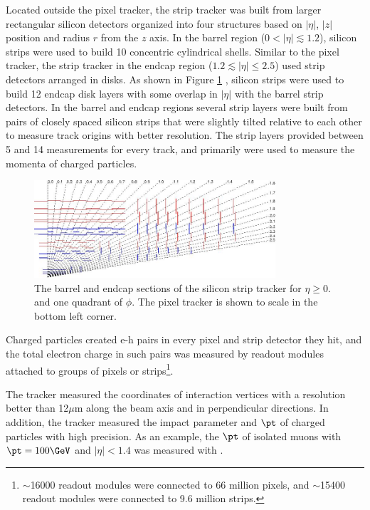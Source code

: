 Located outside the pixel tracker, the strip tracker was built from larger rectangular silicon detectors 
organized into four structures based on $|\eta|$, $|z|$ position and radius $r$ from the $z$ axis.  In the barrel region 
($0 < |\eta| \lesssim 1.2$), silicon strips were used to build 10 concentric cylindrical shells.  Similar to the pixel tracker, the strip tracker in 
the endcap region ($1.2 \lesssim |\eta| \leq 2.5$) used strip detectors arranged in disks.  As shown in Figure \ref{fig:stripTracker} 
\cite{cmsTDR}, silicon strips were used to build 12 endcap disk layers with some overlap in $|\eta|$ with the 
barrel strip detectors.  In the barrel and endcap regions several strip layers were built from pairs of closely spaced 
silicon strips that were slightly tilted relative to each other to measure track origins with better resolution.  The 
strip layers provided between 5 and 14 measurements for every track, and primarily were used to measure the momenta 
of charged particles.

\begin{figure}[ht]
	\centering
	\includegraphics[width=0.8\textwidth]{figures/siliconStripAndPixelDetectorTwoDimView.png}
	\caption{The barrel and endcap sections of the silicon strip tracker for $\eta \geq 0.$ and one quadrant of $\phi$.  
	The pixel tracker is shown to scale in the bottom left corner.}
	\label{fig:stripTracker}
\end{figure}

Charged particles created e-h pairs in every pixel and strip detector they hit, and the total electron charge in such pairs was measured by readout 
modules attached to groups of pixels or strips\footnote{$\sim$16000 readout modules were connected to 66 million pixels, 
and $\sim$15400 readout modules were connected to 9.6 million strips.}.  


The tracker measured the coordinates of interaction vertices with a resolution better than 12$\mu$m along the beam axis 
and in perpendicular directions.  In addition, the tracker measured the impact parameter and $\pt$ of charged particles 
with high precision.  As an example, the $\pt$ of isolated muons with $\pt = 100\GeV$ and $|\eta| < 1.4$ was measured 
with .

